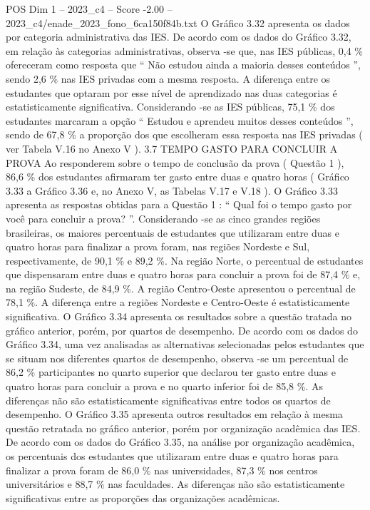 \begin{textsample}{POS Dim 1 – 2023\_c4 – Score -2.00 – 2023\_c4/enade\_2023\_fono\_6ca150f84b.txt}
O Gráfico 3.32 apresenta os dados por categoria administrativa das IES.
De acordo com os dados do Gráfico 3.32, em relação às categorias administrativas, observa -se que, nas IES públicas, 0,4 \% ofereceram como resposta que “ Não estudou ainda a maioria desses conteúdos ”, sendo 2,6 \% nas IES privadas com a mesma resposta.
A diferença entre os estudantes que optaram por esse nível de aprendizado nas duas categorias é estatisticamente significativa.
Considerando -se as IES públicas, 75,1 \% dos estudantes marcaram a opção “ Estudou e aprendeu muitos desses conteúdos ”, sendo de 67,8 \% a proporção dos que escolheram essa resposta nas IES privadas ( ver Tabela V.16 no Anexo V ). 3.7 TEMPO GASTO PARA CONCLUIR A PROVA Ao responderem sobre o tempo de conclusão da prova ( Questão 1 ), 86,6 \% dos estudantes afirmaram ter gasto entre duas e quatro horas ( Gráfico 3.33 a Gráfico 3.36 e, no Anexo V, as Tabelas V.17 e V.18 ).
O Gráfico 3.33 apresenta as respostas obtidas para a Questão 1 : “ Qual foi o tempo gasto por você para concluir a prova? ”.
Considerando -se as cinco grandes regiões brasileiras, os maiores percentuais de estudantes que utilizaram entre duas e quatro horas para finalizar a prova foram, nas regiões Nordeste e Sul, respectivamente, de 90,1 \% e 89,2 \%.
Na região Norte, o percentual de estudantes que dispensaram entre duas e quatro horas para concluir a prova foi de 87,4 \% e, na região Sudeste, de 84,9 \%.
A região Centro-Oeste apresentou o percentual de 78,1 \%.
A diferença entre a regiões Nordeste e Centro-Oeste é estatisticamente significativa.
O Gráfico 3.34 apresenta os resultados sobre a questão tratada no gráfico anterior, porém, por quartos de desempenho.
De acordo com os dados do Gráfico 3.34, uma vez analisadas as alternativas selecionadas pelos estudantes que se situam nos diferentes quartos de desempenho, observa -se um percentual de 86,2 \% participantes no quarto superior que declarou ter gasto entre duas e quatro horas para concluir a prova e no quarto inferior foi de 85,8 \%.
As diferenças não são estatisticamente significativas entre todos os quartos de desempenho.
O Gráfico 3.35 apresenta outros resultados em relação à mesma questão retratada no gráfico anterior, porém por organização acadêmica das IES.
De acordo com os dados do Gráfico 3.35, na análise por organização acadêmica, os percentuais dos estudantes que utilizaram entre duas e quatro horas para finalizar a prova foram de 86,0 \% nas universidades, 87,3 \% nos centros universitários e 88,7 \% nas faculdades.
As diferenças não são estatisticamente significativas entre as proporções das organizações acadêmicas.

\end{textsample}
